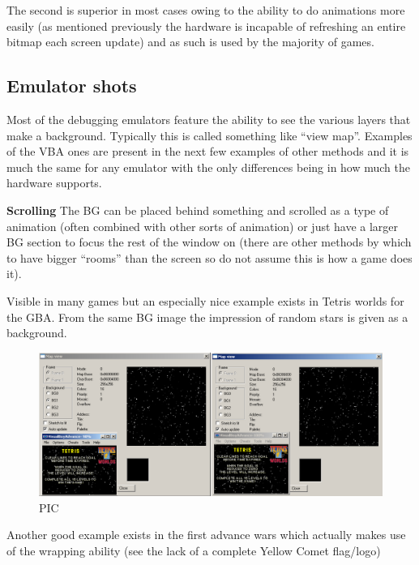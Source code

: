 \documentclass[
]{book}
\begin{document}
The second is superior in most cases owing to the ability to do animations more easily (as mentioned previously the hardware is incapable of refreshing an entire bitmap each screen update) and as such is used by the majority of games.

\hypertarget{emulator-shots}{%
\subsection{Emulator shots}\label{emulator-shots}}

Most of the debugging emulators feature the ability to see the various layers that make a background. Typically this is called something like ``view map''. Examples of the VBA ones are present in the next few examples of other methods and it is much the same for any emulator with the only differences being in how much the hardware supports.

\textbf{Scrolling} The BG can be placed behind something and scrolled as a type of animation (often combined with other sorts of animation) or just have a larger BG section to focus the rest of the window on (there are other methods by which to have bigger ``rooms'' than the screen so do not assume this is how a game does it).

Visible in many games but an especially nice example exists in Tetris worlds for the GBA. From the same BG image the impression of random stars is given as a background.

\begin{figure}
\centering
\includegraphics{images/35_home_fast6191_romhackingguide_unrenamed_file___inal_borders_romhackingguide2dBGscrolling_1.png}
\caption{PIC}
\end{figure}

Another good example exists in the first advance wars which actually makes use of the wrapping ability (see the lack of a complete Yellow Comet flag/logo)
\end{document}
